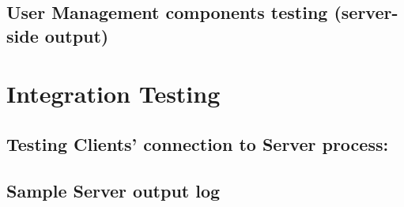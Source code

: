 {\newpage

	\subsection{ User Management components testing (server-side output) }
	

\newpage

}

\section{Integration Testing}

{\small	

	\subsection{ Testing Clients' connection to Server process: }
	

\newpage

	\subsection{ Sample Server output log}
	

}